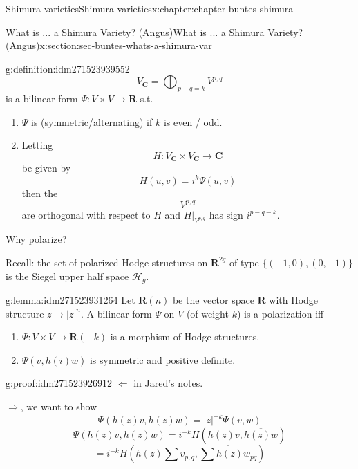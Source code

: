 \documentclass[oneside,10pt,]{book}
\numberwithin{equation}{section}
\newcommand{\RR}{\mathbf{R}}
\newcommand{\CC}{\mathbf{C}}
\begin{document}
\begin{chapterptx}{Shimura varieties}{}{Shimura varieties}{}{}{x:chapter:chapter-buntes-shimura}
\begin{sectionptx}{What is ... a Shimura Variety? (Angus)}{}{What is ... a Shimura Variety? (Angus)}{}{}{x:section:sec-buntes-whats-a-shimura-var}
\begin{definition}{}{g:definition:idm271523939552}
\begin{equation*}
V_\CC = \bigoplus_{p+q = k} V^{p,q}
\end{equation*}
is a bilinear form \(\Psi\colon V\times V \to \RR\) s.t.%
\begin{enumerate}
\item{}\(\Psi\) is (symmetric\slash{}alternating) if \(k\) is even \slash{} odd.%
\item{}Letting%
\begin{equation*}
H\colon V_\CC \times V_\CC \to \CC
\end{equation*}
be given by%
\begin{equation*}
H(u,v) = i^k \Psi(u, \bar v)
\end{equation*}
then the%
\begin{equation*}
V^{p,q}
\end{equation*}
are orthogonal with respect to \(H\) and \(H|_{V^{p,q}}\) has sign \(i^{p-q- k}\).%
\end{enumerate}
%
\end{definition}
Why polarize?%
\par
Recall: the set of polarized Hodge structures on \(\RR^{2g}\) of type \(\{(-1,0), (0,-1)\}\) is the Siegel upper half space \(\mathcal H_g\).%
\begin{lemma}{}{}{g:lemma:idm271523931264}%
Let \(\RR(n) \) be the vector space \(\RR\) with Hodge structure \(z\mapsto |z|^n\). A bilinear form \(\Psi\) on \(V\) (of weight \(k\)) is a polarization iff%
\begin{enumerate}
\item{}\(\Psi\colon V\times V \to \RR(-k)\) is a morphism of  Hodge structures.%
\item{}\(\Psi(v, h(i) w)\) is symmetric and positive definite.%
\end{enumerate}
%
\end{lemma}
\begin{proofptx}{}{g:proof:idm271523926912}
\(\Leftarrow\) in Jared's notes.%
\par
\(\Rightarrow\), we want to show%
\begin{equation*}
\Psi(h(z) v, h(z) w) = |z|^{-k} \Psi(v,w)
\end{equation*}
%
\begin{equation*}
\Psi(h(z) v, h(z) w) = i^{-k} H(h(z) v, \overline{h(z) w})
\end{equation*}
%
\begin{equation*}
=  i^{-k} H(h(z) \sum v_{p,q}, \overline { \sum h(z) w_{pq}})
\end{equation*}
%
\begin{equation*}

\end{equation*}
\end{proofptx}
\end{sectionptx}
\end{chapterptx}
\end{document}
